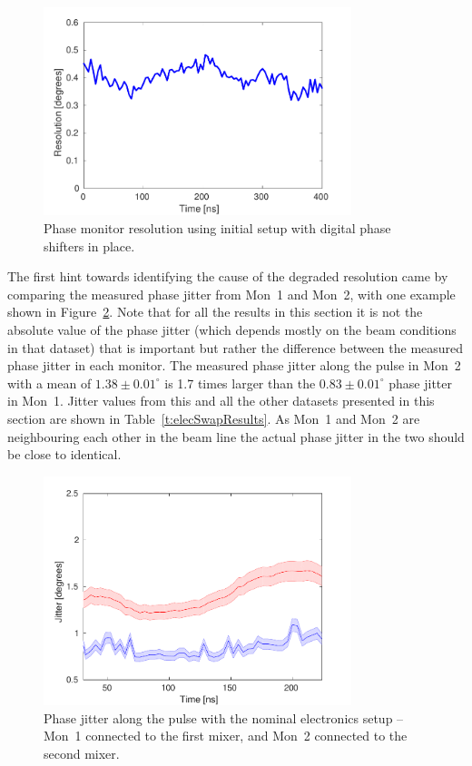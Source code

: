 \begin{figure}
  \centering
  \includegraphics[width=0.8\textwidth]{Figures/phaseMons/resolutionDigShift}
  \caption{Phase monitor resolution using initial setup with digital phase shifters in place.}
  \label{f:resolutionDigShift}
\end{figure}

The first hint towards identifying the cause of the degraded resolution came by comparing the measured phase jitter from Mon~1 and Mon~2, with one example shown in Figure~\ref{f:Mix1Mon1_Mix2Mon2}. Note that for all the results in this section it is not the absolute value of the phase jitter (which depends mostly on the beam conditions in that dataset) that is important but rather the difference between the measured phase jitter in each monitor. The measured phase jitter along the pulse in Mon~2 with a mean of \(1.38\pm0.01^\circ\) is 1.7 times larger than the \(0.83\pm0.01^\circ\) phase jitter in Mon~1. Jitter values from this and all the other datasets presented in this section are shown in Table~\ref{t:elecSwapResults}. As Mon~1 and Mon~2 are neighbouring each other in the beam line the actual phase jitter in the two should be close to identical.

\begin{figure}
  \centering
  \includegraphics[width=0.8\textwidth]{Figures/phaseMons/Mix1Mon1_Mix2Mon2}
  \caption{Phase jitter along the pulse with the nominal electronics setup -- Mon~1 connected to the first mixer, and Mon~2 connected to the second mixer.}
  \label{f:Mix1Mon1_Mix2Mon2}
\end{figure}

